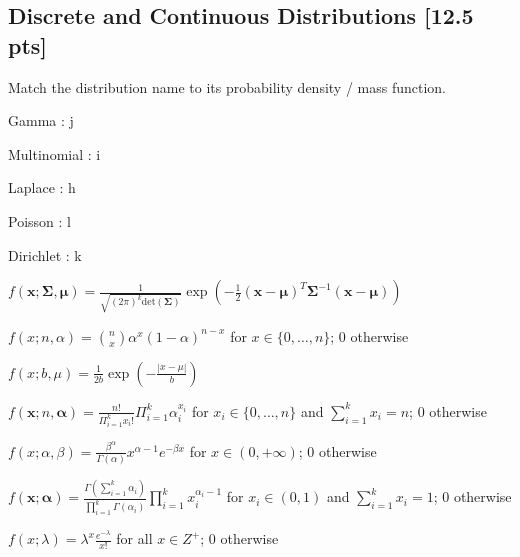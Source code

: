 \documentclass[letter]{article}
\theoremstyle{definition}
\newcommand{\vc}[1]{\boldsymbol{#1}}
\newcommand{\xv}{\vc{x}}
\newcommand{\Sigmav}{\vc{\Sigma}}
\newcommand{\alphav}{\vc{\alpha}}
\newcommand{\muv}{\vc{\mu}}
\newenvironment{soln}{
	\leavevmode\color{black}\ignorespaces
}{}
\begin{document}
	\subsection{Discrete and Continuous Distributions [12.5 pts]}
	Match the distribution name to its probability density / mass
	function.
	\begin{enumerate}[(a)]
		\begin{minipage}{0.4\linewidth}
			\item Gamma \begin{soln} : j \end{soln}
			\item Multinomial  \begin{soln} : i \end{soln}
			\item Laplace \begin{soln}  : h \end{soln}
			\item Poisson \begin{soln}  : l \end{soln}
			\item Dirichlet  \begin{soln}  : k \end{soln}
		\end{minipage}
  \quad
		\begin{minipage}{0.5\linewidth}
			\item $f(\xv; \Sigmav, \muv) = \frac{1}{\sqrt{(2\pi)^k \mathrm{det}(\Sigmav) }} \exp\left( -\frac{1}{2}
			(\xv - \muv)^T \Sigmav^{-1} (\xv - \muv)  \right)$
			\item $f(x; n, \alpha) = \binom{n}{x} \alpha^x (1 - \alpha)^{n-x}$
			for $x \in \{0,\ldots, n\}$; $0$ otherwise
			\item $f(x; b, \mu) = \frac{1}{2b} \exp\left( - \frac{|x - \mu|}{b} \right)$
			\item $f(\xv; n, \alphav) = \frac{n!}{\Pi_{i=1}^k x_i!}
			\Pi_{i=1}^k \alpha_i^{x_i}$ for $x_i \in \{0,\ldots,n\}$ and
			$\sum_{i=1}^k x_i = n$; $0$ otherwise
			\item $f(x; \alpha, \beta) = \frac{\beta^{\alpha}}{\Gamma(\alpha)} x^{\alpha -
				1}e^{-\beta x}$ for $x \in (0,+\infty)$; $0$ otherwise
			\item $f(\xv; \alphav) = \frac{\Gamma(\sum_{i=1}^k
				\alpha_i)}{\prod_{i=1}^k \Gamma(\alpha_i)} \prod_{i=1}^{k}
			x_i^{\alpha_i - 1}$ for $x_i \in (0,1)$ and $\sum_{i=1}^k x_i =
			1$; 0 otherwise
			\item $f(x; \lambda) = \lambda^x \frac{e^{-\lambda}}{x!}$ for all
			$x \in Z^+$; $0$ otherwise
		\end{minipage}
	\end{enumerate}
	
\end{document}
